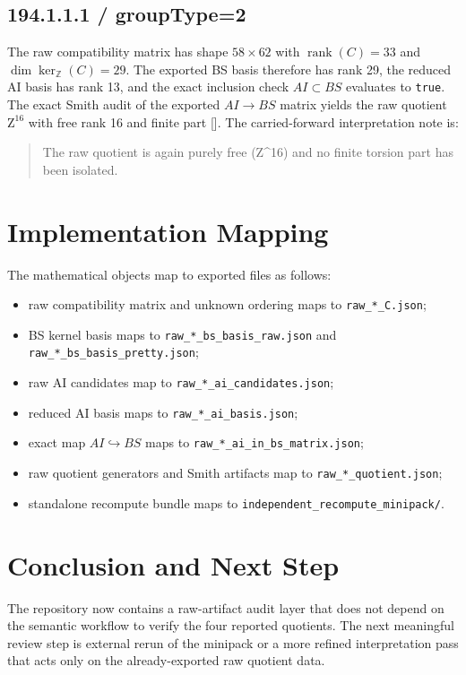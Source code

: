 \documentclass[11pt]{article}
\begin{document}
\subsection*{194.1.1.1 / groupType=2}
The raw compatibility matrix has shape $58 \times 62$ with
$\operatorname{rank}(C) = 33$ and
$\dim \ker_{\mathbb Z}(C) = 29$.
The exported BS basis therefore has rank 29, the reduced AI basis has rank 13,
and the exact inclusion check $AI \subset BS$ evaluates to \texttt{true}.
The exact Smith audit of the exported $AI \to BS$ matrix yields the raw quotient
$\mathrm{Z}^{16}$ with free rank 16 and finite part [].
The carried-forward interpretation note is:
\begin{quote}
The raw quotient is again purely free (Z\textasciicircum{}16) and no finite torsion part has been isolated.
\end{quote}

        \section{Implementation Mapping}
        The mathematical objects map to exported files as follows:
        \begin{itemize}
        \item raw compatibility matrix and unknown ordering maps to \verb|raw_*_C.json|;
        \item BS kernel basis maps to \verb|raw_*_bs_basis_raw.json| and \verb|raw_*_bs_basis_pretty.json|;
        \item raw AI candidates map to \verb|raw_*_ai_candidates.json|;
        \item reduced AI basis maps to \verb|raw_*_ai_basis.json|;
        \item exact map $AI \hookrightarrow BS$ maps to \verb|raw_*_ai_in_bs_matrix.json|;
        \item raw quotient generators and Smith artifacts map to \verb|raw_*_quotient.json|;
        \item standalone recompute bundle maps to \verb|independent_recompute_minipack/|.
        \end{itemize}

        \section{Conclusion and Next Step}
        The repository now contains a raw-artifact audit layer that does not depend on the semantic workflow to verify the four reported quotients.
        The next meaningful review step is external rerun of the minipack or a more refined interpretation pass that acts only on the already-exported raw quotient data.

        
\end{document}
